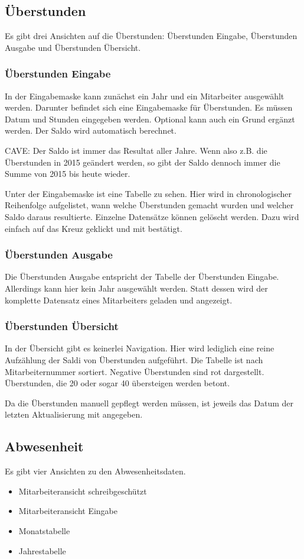 \subsection{Überstunden}
Es gibt drei Ansichten auf die Überstunden: Überstunden Eingabe, Überstunden Ausgabe und Überstunden Übersicht.
\subsubsection{Überstunden Eingabe}
In der Eingabemaske kann zunächst ein Jahr und ein Mitarbeiter ausgewählt werden.
Darunter befindet sich eine Eingabemaske für Überstunden. Es müssen Datum und Stunden eingegeben werden. Optional kann auch ein Grund ergänzt werden. Der Saldo wird automatisch berechnet.

CAVE: Der Saldo ist immer das Resultat aller Jahre. Wenn also z.B. die Überstunden in 2015 geändert werden, so gibt der Saldo dennoch immer die Summe von 2015 bis heute wieder.

Unter der Eingabemaske ist eine Tabelle zu sehen. Hier wird in chronologischer Reihenfolge aufgelistet, wann welche Überstunden gemacht wurden und welcher Saldo daraus resultierte. Einzelne Datensätze können gelöscht werden. Dazu wird einfach auf das Kreuz  geklickt und mit  bestätigt.

\subsubsection{Überstunden Ausgabe}
Die Überstunden Ausgabe entspricht der Tabelle der Überstunden Eingabe. Allerdings kann hier kein Jahr ausgewählt werden. Statt dessen wird der komplette Datensatz eines Mitarbeiters geladen und angezeigt.


\subsubsection{Überstunden Übersicht}
In der Übersicht gibt es keinerlei Navigation. Hier wird lediglich eine reine Aufzählung der Saldi von Überstunden aufgeführt. Die Tabelle ist nach Mitarbeiternummer sortiert. Negative Überstunden sind rot dargestellt. Überstunden, die 20 oder sogar 40 übersteigen werden betont.

Da die Überstunden manuell gepflegt werden müssen, ist jeweils das Datum der letzten Aktualisierung mit angegeben.

\subsection{Abwesenheit}
Es gibt vier Ansichten zu den Abwesenheitsdaten.
\begin{itemize}
\item Mitarbeiteransicht schreibgeschützt
\item Mitarbeiteransicht Eingabe
\item Monatstabelle
\item Jahrestabelle
\end{itemize}
